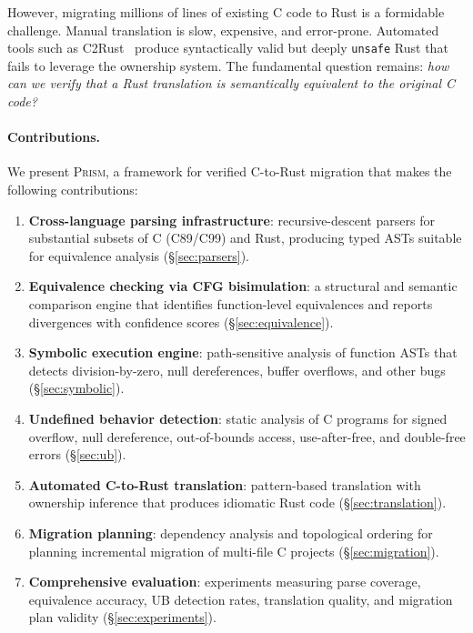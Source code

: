 \documentclass[11pt,a4paper]{article}
\begin{document}
However, migrating millions of lines of existing C code to Rust is a
formidable challenge. Manual translation is slow, expensive, and
error-prone. Automated tools such as C2Rust~\cite{c2rust2019} produce
syntactically valid but deeply \texttt{unsafe} Rust that fails to leverage
the ownership system. The fundamental question remains:
\emph{how can we verify that a Rust translation is semantically equivalent
to the original C code?}

\paragraph{Contributions.} We present \textsc{Prism}, a framework for
verified C-to-Rust migration that makes the following contributions:

\begin{enumerate}[leftmargin=*]
  \item \textbf{Cross-language parsing infrastructure}: recursive-descent
    parsers for substantial subsets of C (C89/C99) and Rust, producing
    typed ASTs suitable for equivalence analysis (\S\ref{sec:parsers}).
  \item \textbf{Equivalence checking via CFG bisimulation}: a structural
    and semantic comparison engine that identifies function-level
    equivalences and reports divergences with confidence scores
    (\S\ref{sec:equivalence}).
  \item \textbf{Symbolic execution engine}: path-sensitive analysis of
    function ASTs that detects division-by-zero, null dereferences,
    buffer overflows, and other bugs (\S\ref{sec:symbolic}).
  \item \textbf{Undefined behavior detection}: static analysis of C
    programs for signed overflow, null dereference, out-of-bounds access,
    use-after-free, and double-free errors (\S\ref{sec:ub}).
  \item \textbf{Automated C-to-Rust translation}: pattern-based
    translation with ownership inference that produces idiomatic Rust
    code (\S\ref{sec:translation}).
  \item \textbf{Migration planning}: dependency analysis and topological
    ordering for planning incremental migration of multi-file C projects
    (\S\ref{sec:migration}).
  \item \textbf{Comprehensive evaluation}: experiments measuring parse
    coverage, equivalence accuracy, UB detection rates, translation
    quality, and migration plan validity (\S\ref{sec:experiments}).
\end{enumerate}
\end{document}
